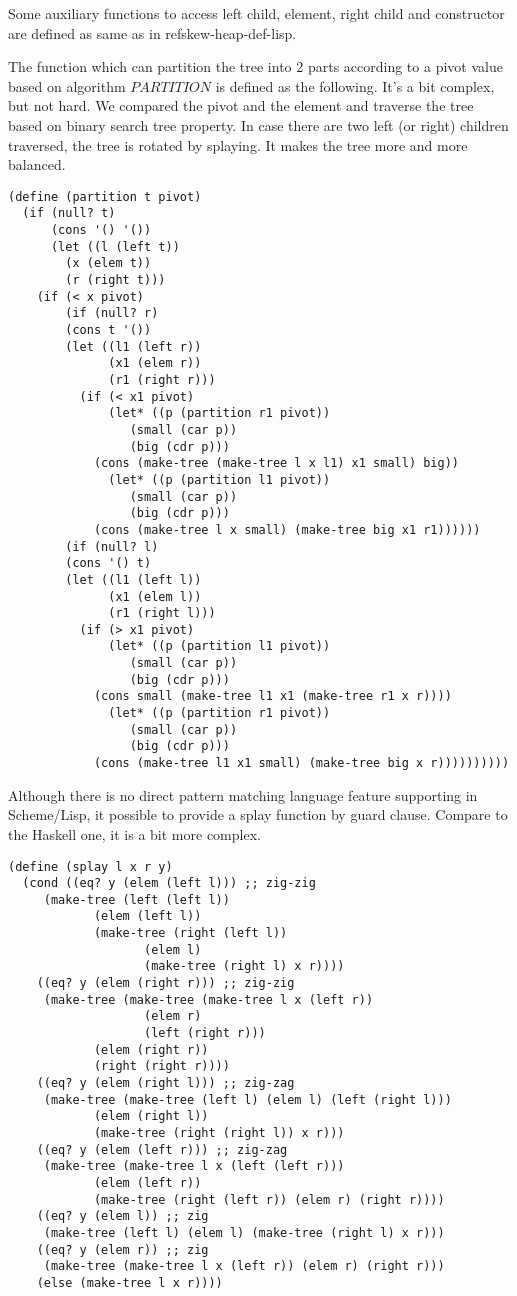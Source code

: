 \documentclass{article}
\begin{document}
Some auxiliary functions to access left child, element, right
child and constructor are defined as same as in ref{skew-heap-def-lisp}.

The function which can partition the tree into 2 parts according to
a pivot value based on algorithm $PARTITION$ is defined as the following.
It's a bit complex, but not hard. We compared the pivot and the element
and traverse the tree based on binary search tree property. In case
there are two left (or right) children traversed, the tree is rotated
by splaying. It makes the tree more and more balanced.

\lstset{language=lisp}
\begin{lstlisting}
(define (partition t pivot)
  (if (null? t)
      (cons '() '())
      (let ((l (left t))
	    (x (elem t))
	    (r (right t)))
	(if (< x pivot)
	    (if (null? r)
		(cons t '())
		(let ((l1 (left r))
		      (x1 (elem r))
		      (r1 (right r)))
		  (if (< x1 pivot)
		      (let* ((p (partition r1 pivot))
			     (small (car p))
			     (big (cdr p)))
			(cons (make-tree (make-tree l x l1) x1 small) big))
		      (let* ((p (partition l1 pivot))
			     (small (car p))
			     (big (cdr p)))
			(cons (make-tree l x small) (make-tree big x1 r1))))))
	    (if (null? l)
		(cons '() t)
		(let ((l1 (left l))
		      (x1 (elem l))
		      (r1 (right l)))
		  (if (> x1 pivot)
		      (let* ((p (partition l1 pivot))
			     (small (car p))
			     (big (cdr p)))
			(cons small (make-tree l1 x1 (make-tree r1 x r))))
		      (let* ((p (partition r1 pivot))
			     (small (car p))
			     (big (cdr p)))
			(cons (make-tree l1 x1 small) (make-tree big x r))))))))))
\end{lstlisting}

Although there is no direct pattern matching language feature supporting in
Scheme/Lisp, it possible to provide a splay function by guard clause.
Compare to the Haskell one, it is a bit more complex.

\begin{lstlisting}
(define (splay l x r y)
  (cond ((eq? y (elem (left l))) ;; zig-zig
	 (make-tree (left (left l))
		    (elem (left l))
		    (make-tree (right (left l))
			       (elem l)
			       (make-tree (right l) x r))))
	((eq? y (elem (right r))) ;; zig-zig
	 (make-tree (make-tree (make-tree l x (left r))
			       (elem r)
			       (left (right r)))
		    (elem (right r))
		    (right (right r))))
	((eq? y (elem (right l))) ;; zig-zag
	 (make-tree (make-tree (left l) (elem l) (left (right l)))
		    (elem (right l))
		    (make-tree (right (right l)) x r)))
	((eq? y (elem (left r))) ;; zig-zag
	 (make-tree (make-tree l x (left (left r)))
		    (elem (left r))
		    (make-tree (right (left r)) (elem r) (right r))))
	((eq? y (elem l)) ;; zig
	 (make-tree (left l) (elem l) (make-tree (right l) x r)))
	((eq? y (elem r)) ;; zig
	 (make-tree (make-tree l x (left r)) (elem r) (right r)))
	(else (make-tree l x r))))
\end{lstlisting}
\end{document}
